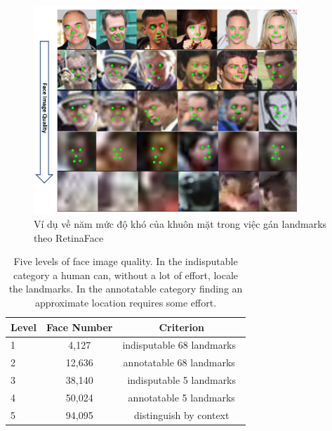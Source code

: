 {    \begin{figure}[H]
        \centering
        \includegraphics[width=10cm] {images/retinaface_widerface.png}
        \caption{Ví dụ về năm mức độ khó của khuôn mặt trong việc gán landmarks theo RetinaFace}
        \label{fig:retinaface_widerface}
    \end{figure}

    \begin{table}[ht!]
        \centering
        \begin{tabular}{l|c|c}
            \hline
            Level            & Face Number &  Criterion\\
            \hline
            1 & 4,127  & indisputable 68 landmarks~\cite{sagonas2013300} \\
            2 & 12,636 & annotatable 68 landmarks~\cite{sagonas2013300} \\
            3 & 38,140 & indisputable 5 landmarks\\
            4 & 50,024 & annotatable 5 landmarks\\
            5 & 94,095 & distinguish by context  \\
            \hline
        \end{tabular}
        \hspace{1in}
        \caption{Five levels of face image quality. In the indisputable category a human can, without a lot of effort, locale the landmarks. In the annotatable category  finding an approximate location requires some effort.}
        \label{tab:fivelevel}
        \vspace{-4mm}
    \end{table}


}
